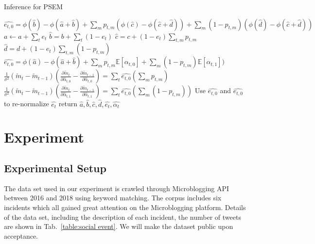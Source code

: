 \documentclass[runningheads]{llncs}
\newcommand{\Ep}{\mathbb{E}}
\begin{document}
\vspace{-0.6cm}
\begin{algorithm}\label{alg:Iterations}
\caption{Inference for PSEM}
\begin{algorithmic}
\STATE $\hat{e_{t,0}} = \phi(\hat{b})-\phi(\hat{a}+\hat{b}) + \sum_{m}  p_{t,m} (\phi(\hat{c})-\phi(\hat{c}+\hat{d})) +\sum_m (1-p_{t,m}) (\phi(\hat{d})-\phi(\hat{c}+\hat{d}))$\;
\STATE $a \leftarrow  a+ \sum_{t} e_{t}$\;
\STATE $\hat{b}  =  b+ \sum_{t} (1-e_{t})$\;
\STATE $\hat{c}  =  c+ (1-e_{t}) \sum_{t,m} p_{t,m}$\;
\STATE $\hat{d}  =  d+ (1-e_{t}) \sum_{t,m} (1-p_{t,m})$\;
\STATE $\hat{e_{t,0}}=\phi(\hat{a})-\phi(\hat{a}+\hat{b}) + \sum_{m}  p_{t,m}   \Ep[\alpha_{t,0}] +\sum_m (1-p_{t,m}) \Ep[\alpha_{t,1}])$\;
\STATE $\frac{1}{\sigma^2}(\widetilde{m}_{t}-\widetilde{m}_{t-1})(\frac{\partial \widetilde{m}_{t}}{\partial \hat{\alpha}_{t,0}}-\frac{\partial \widetilde{m}_{t-1}}{\partial \hat{\alpha}_{t,0}}) = \sum_t \hat{e_{t,0}} (\sum_m p_{t,m})$
\STATE $\frac{1}{\sigma^2}(\widetilde{m}_{t}-\widetilde{m}_{t-1})(\frac{\partial \widetilde{m}_{t}}{\partial \hat{\alpha}_{t,1}}-\frac{\partial \widetilde{m}_{t-1}}{\partial \hat{\alpha}_{t,1}}) = \sum_t \hat{e_{t,0}} (\sum_m (1-p_{t,m}))$
\ENDWHILE\;
Use $\hat{e_{t,0}}$ and $\hat{e_{t,0}}$ to re-normalize $\hat{e_{t}}$\;
return $\hat{a},\hat{b},\hat{c},\hat{d},\hat{e_{t}},\hat{\alpha_{t}}$
\end{algorithmic}
\end{algorithm}
\vspace{-0.6cm}




\section{Experiment}\label{sec:Experiment}
\subsection{Experimental Setup}
The data set used in our experiment is crawled through Microblogging API between 2016 and 2018 using keyword matching. The corpus includes six incidents which all gained great attention on the Microblogging platform. Details of the data set, including the description of each incident, the number of tweets are shown in Tab.~\ref{table:social event}. We will make the dataset public upon acceptance.
\end{document}
